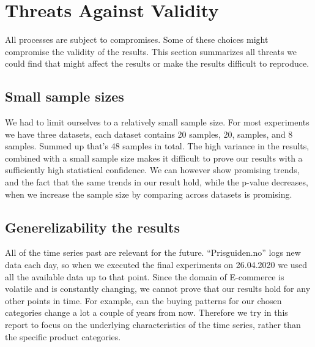 \section{Threats Against Validity}
\label{section:Discussion:Threats}
All processes are subject to compromises. Some of these choices might compromise the validity of
the results. This section summarizes all threats we could find that might affect the results or make
the results difficult to reproduce.

\subsection{Small sample sizes}
We had to limit ourselves to a relatively small sample size. For most experiments we have
three datasets, each dataset contains 20 samples, 20, samples, and 8 samples.
Summed up that's 48 samples in total. The high variance in the results, combined with a small sample size
makes it difficult to prove our results with a sufficiently high statistical confidence.
We can however show promising trends, and the fact that the same trends in our result hold, while
the p-value decreases, when
we increase the sample size by comparing across datasets is promising.




\subsection{Generelizability the results}
All of the time series past are relevant for the future. ``Prisguiden.no'' logs new data each day,
so when we executed the final experiments on 26.04.2020 we used all the available data up to that point.
Since the domain of E-commerce is volatile and is constantly changing, we cannot prove that our
results hold for any other points in time. For example, can the buying patterns for our chosen categories
change a lot a couple of years from now.
Therefore we try in this report to focus on the underlying characteristics of the time series, rather than
the specific product categories.


